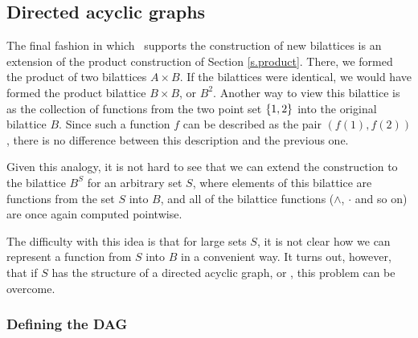 \subsection{Directed acyclic graphs}
\label{s.dag}

The final fashion in which \mvl\ supports the construction of new
bilattices is an extension of the product construction of Section
\ref{s.product}.  There, we formed the product of two bilattices
$A\times B$.  If the bilattices were identical, we would have formed
the product bilattice $B\times B$, or $B^2$.  Another way to view
this bilattice is as the collection of functions from the two point
set $\{1,2\}$ into the original bilattice $B$.  Since such a
function $f$ can be described as the pair $(f(1),f(2))$, there is no
difference between this description and the previous one.

Given this analogy, it is not hard to see that we can extend the
construction to the bilattice $B^S$ for an arbitrary set $S$, where
elements of this bilattice are functions from the set $S$ into $B$,
and all of the bilattice functions ($\wedge$, $\cdot$ and so on) are
once again computed pointwise.

The difficulty with this idea is that for large sets $S$, it is not
clear how we can represent a function from $S$ into $B$ in a
convenient way.  It turns out, however, that if $S$ has the structure
of a directed acyclic graph, or \dg, this problem can be overcome.

\subsubsection{Defining the DAG}

